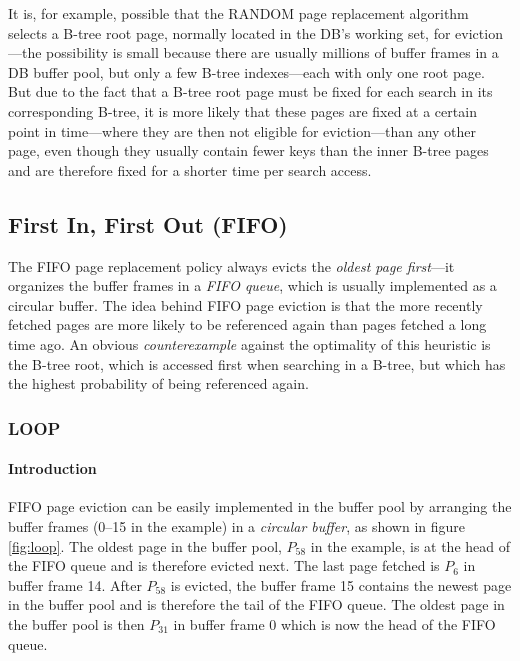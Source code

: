     It is, for example, possible that the RANDOM page replacement algorithm selects a B-tree root page, normally located in the DB's working set, for eviction---the possibility is small because there are usually millions of buffer frames in a DB buffer pool, but only a few B-tree indexes---each with only one root page. But due to the fact that a B-tree root page must be fixed for each search in its corresponding B-tree, it is more likely that these pages are fixed at a certain point in time---where they are then not eligible for eviction---than any other page, even though they usually contain fewer keys than the inner B-tree pages and are therefore fixed for a shorter time per search access.

\subsection[FIFO]{First In, First Out (FIFO)} \label{subsec:fifo}

    The FIFO page replacement policy always evicts the \emph{oldest page first}---it organizes the buffer frames in a \emph{FIFO queue}, which is usually implemented as a circular buffer. The idea behind FIFO page eviction is that the more recently fetched pages are more likely to be referenced again than pages fetched a long time ago. An obvious \emph{counterexample} against the optimality of this heuristic is the B-tree root, which is accessed first when searching in a B-tree, but which has the highest probability of being referenced again.

\subsubsection{LOOP} \label{subsubsec:loop}

\paragraph{Introduction}

    FIFO page eviction can be easily implemented in the buffer pool by arranging the buffer frames (\numrange{0}{15} in the example) in a \emph{circular buffer}, as shown in figure \ref{fig:loop}. The oldest page in the buffer pool, $P_{58}$ in the example, is at the head of the FIFO queue and is therefore evicted next. The last page fetched is $P_{6}$ in buffer frame 14. After $P_58$ is evicted, the buffer frame 15 contains the newest page in the buffer pool and is therefore the tail of the FIFO queue. The oldest page in the buffer pool is then $P_{31}$ in buffer frame 0 which is now the head of the FIFO queue.

